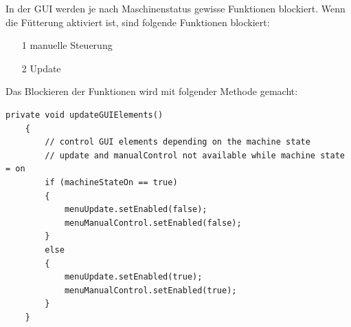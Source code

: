 \vspace{10pt}

In der \ac{GUI} werden je nach Maschinenstatus gewisse Funktionen blockiert. Wenn die Fütterung aktiviert ist, sind folgende Funktionen blockiert:
\begin{itemize}
\item[1] manuelle Steuerung
\item[2] Update
\end{itemize}
Das Blockieren der Funktionen wird mit folgender Methode gemacht:
\begin{lstlisting}[style=JavaStyle, caption=GUI Elemente blockieren]
private void updateGUIElements()
    {
        // control GUI elements depending on the machine state
        // update and manualControl not available while machine state = on 
        if (machineStateOn == true)
        {
            menuUpdate.setEnabled(false);
            menuManualControl.setEnabled(false);
        }
        else
        {
            menuUpdate.setEnabled(true);
            menuManualControl.setEnabled(true);
        }
    }
\end{lstlisting}

\newpage

